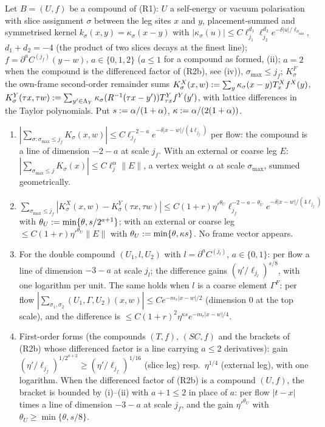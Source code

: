 \begin{lemma}\label{rot:h1s:U}
Let $B=(U,f)$ be a compound of (R1): $U$ a self-energy or vacuum polarisation with slice assignment $\sigma$ between the leg sites $x$ and $y$, placement-summed and symmetrised kernel $k_\sigma(x,y)=\kappa_\sigma(x-y)$ with $|\kappa_\sigma(u)|\le C\ell_{j_1}^{d_1}\ell_{j_2}^{d_2}e^{-\delta|u|/\ell_{\sigma_{\min}}}$, $d_1+d_2=-4$ (the product of two slices decays at the finest line); $f=\partial^aC^{(j_f)}(y-w)$, $a\in\{0,1,2\}$ ($a\le1$ for a compound as formed, (ii); $a=2$ when the compound is the differenced factor of (R2b), see (iv)), $\sigma_{\max}\le j_f$; $K^F_\sigma$ the own-frame second-order remainder sums $K^X_\sigma(x,w):=\sum_{y}\kappa_\sigma(x-y)T^X_xf^X(y)$, $K^Y_\sigma(\tau x,\tau w):=\sum_{y'\in\Lambda_Y}\kappa_\sigma(R^{-1}(\tau x-y'))T^Y_{\tau x}f^Y(y')$, with lattice differences in the Taylor polynomials. Put $s:=\alpha/(1+\alpha)$, $\kappa:=\alpha/(2(1+\alpha))$.
\begin{enumerate}[label=\textup{(\roman*)},nosep,leftmargin=*]
\item $|\sum_{\sigma:\sigma_{\max}\le j_f}K_\sigma(x,w)|\le C\ell_{j_f}^{-2-a}e^{-\delta|x-w|/(4\ell_{j_f})}$ per flow: the compound is a line of dimension $-2-a$ at scale $j_f$. With an external or coarse leg $E$: $|\sum_{\sigma_{\max}\le j}K_\sigma(x)|\le C\ell_j^\alpha\|E\|$, a vertex weight $\alpha$ at scale $\sigma_{\max}$, summed geometrically.
\item $\sum_{\sigma_{\max}\le j_f}|K^X_\sigma(x,w)-K^Y_\sigma(\tau x,\tau w)|\le C(1+r)\eta'^{\theta_U}\ell_{j_f}^{-2-a-\theta_U}e^{-\delta|x-w|/(4\ell_{j_f})}$ with $\theta_U:=\min\{\theta,s/2^{a+1}\}$; with an external or coarse leg $\le C(1+r)\eta'^{\theta_U}\|E\|$ with $\theta_U:=\min\{\theta,\kappa s\}$. No frame vector appears.
\item For the double compound $(U_1,l,U_2)$ with $l=\partial^aC^{(j_l)}$, $a\in\{0,1\}$: per flow a line of dimension $-3-a$ at scale $j_l$; the difference gains $(\eta'/\ell_{j_l})^{s/8}$, with one logarithm per unit. The same holds when $l$ is a coarse element $\Gamma^F$: per flow $|\sum_{\sigma_1,\sigma_2}(U_1,\Gamma,U_2)(x,w)|\le Ce^{-m_r|x-w|/2}$ (dimension $0$ at the top scale), and the difference is $\le C(1+r)^2\eta^{\kappa s}e^{-m_r|x-w|/4}$.
\item First-order forms (the compounds $(T,f)$, $(SC,f)$ and the brackets of (R2b) whose differenced factor is a line carrying $a\le2$ derivatives): gain $(\eta'/\ell_{j_f})^{1/2^{a+2}}\ge(\eta'/\ell_{j_f})^{1/16}$ (slice leg) resp.\ $\eta^{1/4}$ (external leg), with one logarithm. When the differenced factor of (R2b) is a compound $(U,f)$, the bracket is bounded by (i)--(ii) with $a+1\le2$ in place of $a$: per flow $|t-x|$ times a line of dimension $-3-a$ at scale $j_f$, and the gain $\eta'^{\theta_U}$ with $\theta_U\ge\min\{\theta,s/8\}$.
\end{enumerate}
\end{lemma}

